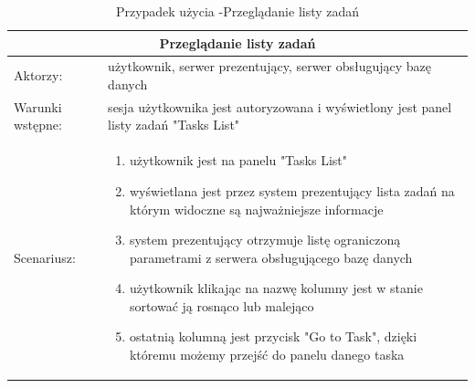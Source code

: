 \begin{table}[h!]
	\begin{tabular}{|p{2cm}||p{13cm}|  }
		
		\hline
		\multicolumn{2}{|c|}{Przeglądanie listy zadań} \\
		\hline
		Aktorzy: &użytkownik, serwer prezentujący, serwer obsługujący bazę danych\\
		\hline
		Warunki wstępne: & sesja użytkownika jest autoryzowana i wyświetlony jest panel listy zadań "Tasks List"\\
		\hline
		Scenariusz: &
		\begin{enumerate}
			\item użytkownik jest na panelu "Tasks List"
			\item wyświetlana jest przez system prezentujący lista zadań na którym widoczne są najważniejsze informacje
			\item system prezentujący otrzymuje listę ograniczoną parametrami z serwera obsługującego bazę danych
			\item użytkownik klikając na nazwę kolumny jest w stanie sortować ją rosnąco lub malejąco
			\item ostatnią kolumną jest przycisk "Go to Task", dzięki któremu możemy przejść do panelu danego taska
		\end{enumerate}\\
		\hline
	\end{tabular}
	\caption{Przypadek użycia -Przeglądanie listy zadań}
\end{table}




